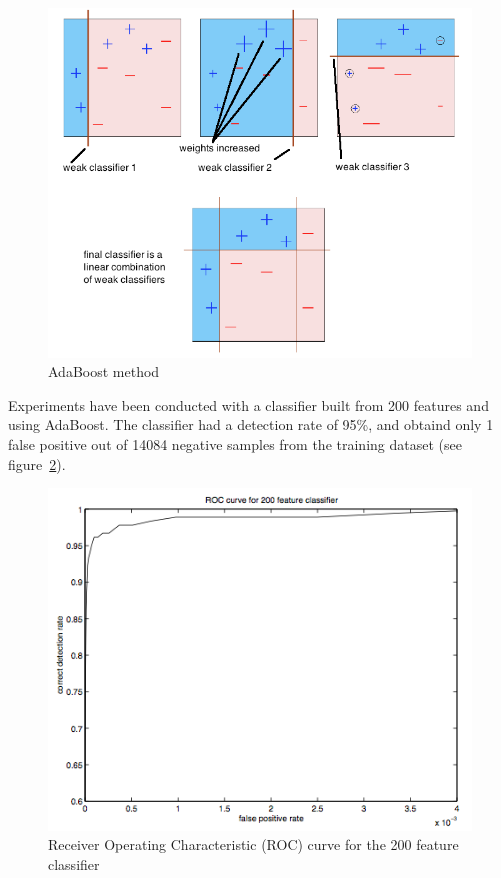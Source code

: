 \begin{figure}[!h]
\begin{center}
\noindent \includegraphics[scale=0.6]{figures/haar_feature_adaboost} 
\newline
\caption{AdaBoost method}
\label{haar_feature_adaboost}
\end{center} 
\end{figure}

\noindent Experiments have been conducted with a classifier built from 200 features and using AdaBoost. The classifier had a detection rate of 95\%, and obtaind only 1 false positive out of 14084 negative samples from the training dataset (see figure~\ref{haar_feature_example_result})\cite{VIO01}.
\newline

\begin{figure}[!h]
\begin{center}
\noindent \includegraphics[scale=0.8]{figures/haar_feature_example_result} 
\newline
\caption{Receiver Operating Characteristic (ROC) curve for the 200 feature classifier}
\label{haar_feature_example_result}
\end{center} 
\end{figure}

